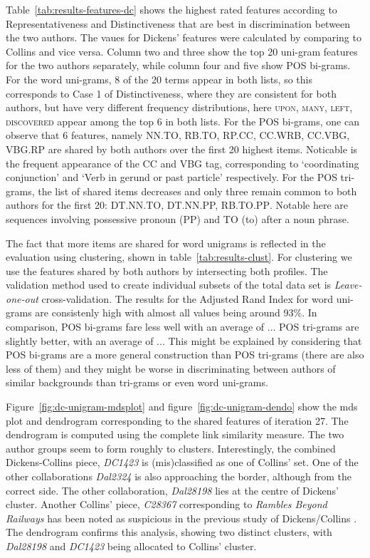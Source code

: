 \documentclass[a4paper,10pt,twoside,fleqn]{article}
\begin{document}
Table~\ref{tab:results-features-dc} shows the highest rated features 
according to Representativeness and Distinctiveness that are best 
in discrimination between the two authors. The vaues for Dickens' features 
were calculated by comparing to Collins and vice versa. 
Column two and three show the top 20 uni-gram features for the two authors
separately, while column four and five show POS bi-grams. 
For the word uni-grams, 8 of the 20 terms appear in both lists, so this corresponds
to Case 1 of Distinctiveness, where they are consistent for both authors, but
have very different frequency distributions, here \textsc{upon, many, left, discovered}
appear among the top 6 in both lists. 
For the POS bi-grams, one can observe that  6 features, namely
\textsc{NN.TO, RB.TO, RP.CC, CC.WRB, CC.VBG, VBG.RP} 
are shared by both authors over the first 20 highest items. 
Noticable is the frequent appearance of the CC and VBG tag, 
corresponding to `coordinating conjunction' and `Verb in gerund or
past particle' respectively. 
For the POS tri-grams, the list of shared items decreases and only three remain 
common to both authors for the first 20: \textsc{DT.NN.TO,  DT.NN.PP, RB.TO.PP}.
Notable here are sequences involving possessive pronoun (PP) and TO (to) after 
a noun phrase. 

The fact that more items are shared for word unigrams is reflected in the evaluation using 
clustering, shown in table~\ref{tab:results-clust}.
For clustering we use the features shared by both authors by intersecting both profiles. 
The validation method used to create individual subsets of the total data set 
is \emph{Leave-one-out} cross-validation. 
The results for the Adjusted Rand Index for word uni-grams are consistenly high with 
almost all values being around 93\%. In comparison, POS bi-grams fare less well
with an average of ...
POS tri-grams are slightly better, with an average of ...
This might be explained by considering that POS bi-grams are a more general 
construction than POS tri-grams (there are also less of them) and they might
be worse in discriminating between authors of similar backgrounds 
than tri-grams or even word uni-grams. 


Figure~\ref{fig:dc-unigram-mdsplot} and figure~\ref{fig:dc-unigram-dendo} 
show the mds plot and dendrogram corresponding to the shared features of 
iteration 27. The dendrogram is computed using the complete link similarity 
measure. The two author groups seem to form roughly to clusters. 
Interestingly, the combined Dickens-Collins piece, \emph{DC1423} is 
(mis)classified as one of Collins' set. One of the other collaborations 
\emph{Dal2324} is also approaching the border, although from the correct
side. The other collaboration, \emph{Dal28198} lies at the centre of
Dickens' cluster. 
Another Collins' piece, \emph{C28367} corresponding to 
\emph{Rambles Beyond Railways} has been noted as suspicious in the 
previous study of Dickens/Collins \cite{Tabata2012}.
The dendrogram confirms this analysis, showing two distinct 
clusters, with \emph{Dal28198} and \emph{DC1423} being allocated
to Collins' cluster. 
\end{document}
